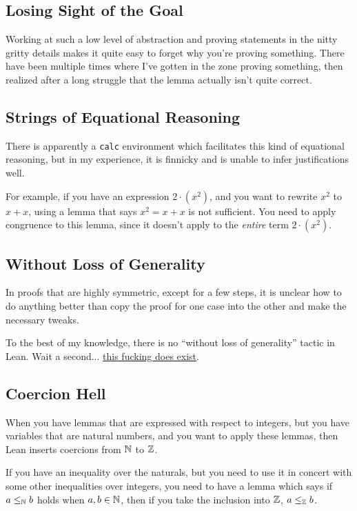 \documentclass{article}
\begin{document}
\subsection{Losing Sight of the Goal}
Working at such a low level of abstraction and proving statements in the nitty gritty details makes it quite easy to forget why you're proving something.
There have been multiple times where I've gotten in the zone proving something, then realized after a long struggle that the lemma actually isn't quite correct.

\subsection{Strings of Equational Reasoning}
There is apparently a \texttt{calc} environment which facilitates this kind of equational reasoning, but in my experience, it is finnicky and is unable to infer justifications well.

For example, if you have an expression $2 \cdot (x^2)$, and you want to rewrite $x^2$ to $x + x$, using a lemma that says $x^2 = x + x$ is not sufficient.
You need to apply congruence to this lemma, since it doesn't apply to the \textit{entire} term $2 \cdot (x^2)$.

\subsection{Without Loss of Generality}
In proofs that are highly symmetric, except for a few steps, it is unclear how to do anything better than copy the proof for one case into the other and make the necessary tweaks.

To the best of my knowledge, there is no ``without loss of generality'' tactic in Lean.
Wait a second... \href{https://leanprover-community.github.io/mathlib_docs/tactic/wlog.html}{this fucking does exist}.

\subsection{Coercion Hell}
When you have lemmas that are expressed with respect to integers, but you have variables that are natural numbers, and you want to apply these lemmas, then Lean inserts coercions from $\mathbb{N}$ to $\mathbb{Z}$.

If you have an inequality over the naturals, but you need to use it in concert with some other inequalities over integers, you need to have a lemma which says if $a \leq_{\mathbb{N}} b$ holds when $a,b \in \mathbb{N}$, then if you take the inclusion into $\mathbb{Z}$, $a \leq_{\mathbb{Z}} b$.
\end{document}
